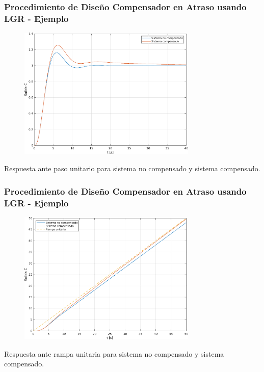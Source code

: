 \documentclass[aspectratio=169,handout]{beamer}
\theoremstyle{definition}
\theoremstyle{plain}
\theoremstyle{remark}
\begin{document}
\begin{frame}[<+->]\frametitle{Procedimiento de Diseño Compensador en Atraso usando LGR - Ejemplo}
\begin{figure}
	\includegraphics[width=8.5cm]{images/ejemplo2_comparacion_paso.eps}
\end{figure}
\vspace*{-3mm}
\centering \small Respuesta ante paso unitario para sistema no compensado y sistema compensado.
\end{frame}

\begin{frame}[<+->]\frametitle{Procedimiento de Diseño Compensador en Atraso usando LGR - Ejemplo}
\begin{figure}
	\includegraphics[width=8.5cm]{images/ejemplo2_comparacion_rampa.eps}
\end{figure}
\vspace*{-3mm}
\centering \small Respuesta ante rampa unitaria para sistema no compensado y sistema compensado.
\end{frame}
\end{document}
